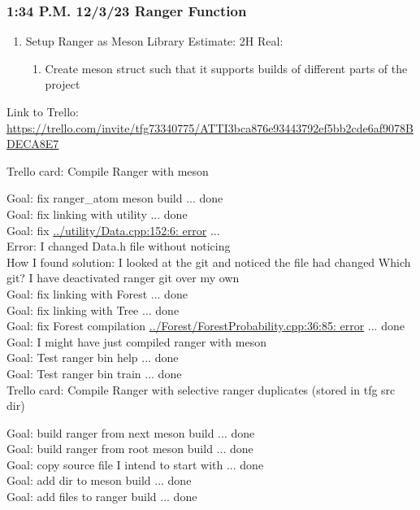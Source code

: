 \documentclass[12pt,oneside]{book}
\begin{document}
  \subsubsection*{1:34 P.M. 12/3/23 Ranger Function}
  \begin{enumerate}
    \item Setup Ranger as Meson Library Estimate: 2H Real: 
    \begin{enumerate}
      \item Create meson struct such that it supports builds of different parts of the project
    \end{enumerate}
  \end{enumerate}

  Link to Trello: \url{https://trello.com/invite/tfg73340775/ATTI3bca876e93443792ef5bb2cde6af9078BDECA8E7}

  Trello card: Compile Ranger with meson

  Goal: fix ranger\_atom meson build ... done \\
  Goal: fix linking with utility  ... done \\
  Goal: fix \url{../utility/Data.cpp:152:6: error} ... \\
  Error: I changed Data.h file without noticing \\
  How I found solution: I looked at the git and noticed the file had changed
  Which git?
  I have deactivated ranger git over my own \\
  Goal: fix linking with Forest ... done \\
  Goal: fix linking with Tree ... done \\
  Goal: fix Forest compilation \url{../Forest/ForestProbability.cpp:36:85: error} ... done \\
  Goal: I might have just compiled ranger with meson \\
  Goal: Test ranger bin help ... done \\
  Goal: Test ranger bin train ... done \\

  Trello card: Compile Ranger with selective ranger duplicates (stored in tfg src dir)

  Goal: build ranger from next meson build ... done \\
  Goal: build ranger from root meson build ... done \\
  Goal: copy source file I intend to start with ... done \\
  Goal: add dir to meson build ... done \\
  Goal: add files to ranger build ... done \\
  
\end{document}
